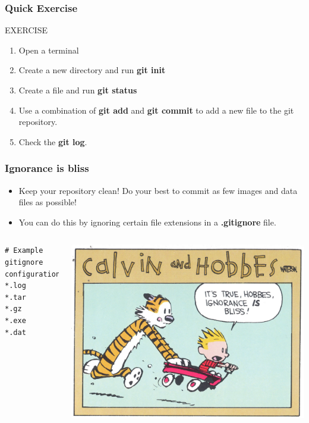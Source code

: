 \documentclass{beamer}
\begin{document}
\begin{frame}[fragile]
\frametitle{Quick Exercise}
    \begin{block}{EXERCISE}
        \begin{enumerate}
        \item Open a terminal
        \item Create a new directory and run \textbf{git init}
        \item Create a file and run \textbf{git status}
        \item Use a combination of \textbf{git add} and \textbf{git commit} to add a new file to the git repository.
        \item Check the \textbf{git log}.
        \end{enumerate}
    \end{block}

\end{frame}

\begin{frame}[fragile]
\frametitle{Ignorance is bliss}

\begin{itemize}
\item Keep your repository clean! Do your best to commit as few images and data files as possible!
\item You can do this by ignoring certain file extensions in a \textbf{.gitignore} file.
\end{itemize}
\begin{columns}
\begin{lstlisting}
# Example gitignore configuration
*.log
*.tar
*.gz
*.exe
*.dat
\end{lstlisting}
\includegraphics[width=\textwidth]{IIB.jpg}
\end{columns}
\end{frame}
\end{document}
